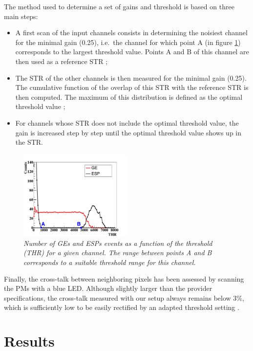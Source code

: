 \documentclass[a4paper,11pt]{article}
\begin{document}
The method used to determine a set of gains and threshold is based on three main steps:
\begin{itemize}
	\item A first scan of the input channels consists in determining the noisiest channel for the minimal gain (0.25), i.e.~the channel for which point A (in figure \ref{fig:S_Curve}) corresponds to the largest threshold value. Points A and B of this channel are then used as a reference STR ;
	\item The STR of the other channels is then measured for the minimal gain (0.25). The cumulative function of the overlap of this STR with the reference STR is then computed. The maximum of this distribution is defined as the optimal threshold value ;
	\item For channels whose STR does not include the optimal threshold value, the gain is increased step by step until the optimal threshold value shows up in the STR.
\end{itemize}

\begin{figure}[htb]
\centering
\includegraphics[width=0.5\textwidth]{figures/S_Curve_Thr_suitable_rangeAB.pdf}
\caption{\small{\textit{Number of GEs and ESPs events as a function of the threshold (THR) for a given channel. The range between points A and B corresponds to a suitable threshold range for this channel.}}}
\label{fig:S_Curve}
\end{figure}

Finally, the cross-talk between neighboring pixels has been assessed by scanning the PMs with a blue LED. Although slightly larger than the provider specifications, the cross-talk measured with our setup always remains below 3\%, which is sufficiently low to be easily rectified by an adapted threshold setting \cite{FontanaPhD}.

\section{Results}
\end{document}
